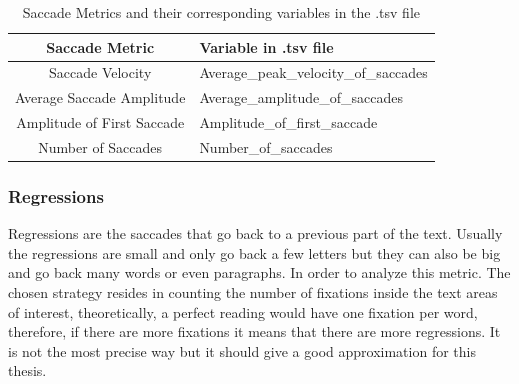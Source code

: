 \begin{table}[H]
\caption{Saccade Metrics and their corresponding variables in the .tsv file}
    \begin{tabularx}{\textwidth}{|c|X|}
        \hline
        \textbf{Saccade Metric} & \textbf{Variable in .tsv file} \\
        \hline
        Saccade Velocity & Average\_peak\_velocity\_of\_saccades \\
        \hline
        Average Saccade Amplitude & Average\_amplitude\_of\_saccades \\
        \hline
        Amplitude of First Saccade & Amplitude\_of\_first\_saccade \\
        \hline
        Number of Saccades & Number\_of\_saccades \\
        \hline
    \end{tabularx}
\end{table}
\subsubsection{Regressions}
Regressions are the saccades that go back to a previous part of the text. Usually the regressions are small and only 
go back a few letters \cite{Poole2006} but they can also be big and go back many words or even paragraphs. In order to 
analyze this metric. The chosen strategy resides in counting the number of fixations inside the text areas of interest,
theoretically, a perfect reading would have one fixation per word, therefore, if there are more fixations it means that 
there are more regressions. It is not the most precise way but it should give a good approximation for this thesis.
